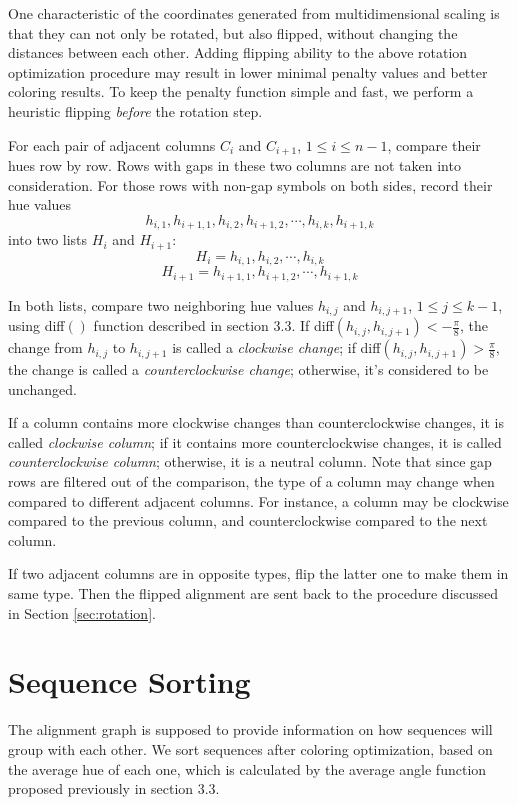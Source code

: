 One characteristic of the coordinates generated from multidimensional scaling is that they can not only be rotated, but also flipped, without changing the distances between each other. Adding flipping ability to the above rotation optimization procedure may result in lower minimal penalty values and better coloring results. To keep the penalty function simple and fast, we perform a heuristic flipping \emph{before} the rotation step.

For each pair of adjacent columns $C_i$ and $C_{i+1}$, $1 \le i \le n-1$, compare their hues row by row. Rows with gaps in these two columns are not taken into consideration. For those rows with non-gap symbols on both sides, record their hue values $$h_{i,1},h_{i+1,1},h_{i,2},h_{i+1,2},\cdots,h_{i,k},h_{i+1,k}$$ into two lists $H_i$ and $H_{i+1}$: $$H_i=h_{i,1},h_{i,2},\cdots,h_{i,k}$$ $$H_{i+1}=h_{i+1,1},h_{i+1,2},\cdots,h_{i+1,k}$$

In both lists, compare two neighboring hue values $h_{i,j}$ and $h_{i,j+1}$, $1\le j\le k-1$, using diff$()$ function described in section 3.3. If diff$(h_{i,j},h_{i,j+1})<-\frac{\pi}{8}$, the change from $h_{i,j}$ to $h_{i,j+1}$ is called a \emph{clockwise change}; if diff$(h_{i,j},h_{i,j+1})>\frac{\pi}{8}$, the change is called a \emph{counterclockwise change}; otherwise, it's considered to be unchanged.

If a column contains more clockwise changes than counterclockwise changes, it is called \emph{clockwise column}; if it contains more counterclockwise changes, it is called \emph{counterclockwise column}; otherwise, it is a neutral column. Note that since gap rows are filtered out of the comparison, the type of a column may change when compared to different adjacent columns. For instance, a column may be clockwise compared to the previous column, and counterclockwise compared to the next column.

If two adjacent columns are in opposite types, flip the latter one to make them in same type. Then the flipped alignment are sent back to the procedure discussed in Section \ref{sec:rotation}.

\section{Sequence Sorting}

The alignment graph is supposed to provide information on how sequences will group with each other. We sort sequences after coloring optimization, based on the average hue of each one, which is calculated by the average angle function proposed previously in section 3.3.

